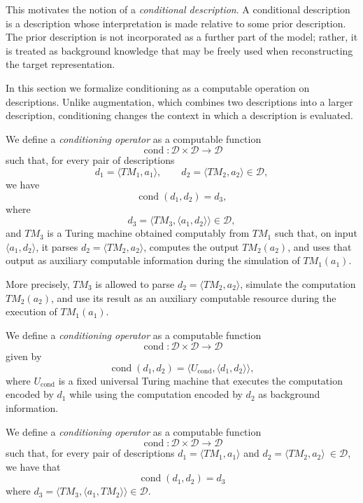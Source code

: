 This motivates the notion of a \emph{conditional description}. A conditional description is a description whose interpretation is made relative to some prior description. The prior description is not incorporated as a further part of the model; rather, it is treated as background knowledge that may be freely used when reconstructing the target representation.

In this section we formalize conditioning as a computable operation on descriptions. Unlike augmentation, which combines two descriptions into a larger description, conditioning changes the context in which a description is
evaluated.

\begin{definition}
We define a \emph{conditioning operator} as a computable function
\[
\operatorname{cond}:\mathcal D\times \mathcal D\to \mathcal D
\]
such that, for every pair of descriptions
\[
d_1 = \langle TM_1, a_1 \rangle,
\qquad
d_2 = \langle TM_2, a_2 \rangle \in \mathcal D,
\]
we have
\[
\operatorname{cond}(d_1,d_2)=d_3,
\]
where
\[
d_3=\langle TM_3,\langle a_1,d_2\rangle\rangle \in \mathcal D,
\]
and \(TM_3\) is a Turing machine obtained computably from \(TM_1\) such that, on input
\(\langle a_1,d_2\rangle\), it parses \(d_2=\langle TM_2,a_2\rangle\), computes the output
\(TM_2(a_2)\), and uses that output as auxiliary computable information during the simulation of
\(TM_1(a_1)\).
\end{definition}

More precisely, \(TM_3\) is allowed to parse \(d_2=\langle TM_2,a_2\rangle\),
simulate the computation \(TM_2(a_2)\), and use its result as an auxiliary
computable resource during the execution of \(TM_1(a_1)\).

\begin{definition}
We define a \emph{conditioning operator} as a computable function
\[
\operatorname{cond}:\mathcal D\times \mathcal D\to \mathcal D
\]
given by
\[
\operatorname{cond}(d_1,d_2)
=
\langle U_{\mathrm{cond}},\langle d_1,d_2\rangle\rangle,
\]
where \(U_{\mathrm{cond}}\) is a fixed universal Turing machine that executes the
computation encoded by \(d_1\) while using the computation encoded by \(d_2\)
as background information.
\end{definition}



\begin{definition}
We define a \emph{conditioning operator} as a computable function
\[
\operatorname{cond}:\mathcal D\times \mathcal D\to \mathcal D
\]
such that, for every pair of descriptions \(d_1 = \langle TM_1, a_1 \rangle\) and
\(d_2 = \langle TM_2, a_2 \rangle\ \in \mathcal D\), we have that
\[
\operatorname{cond}(d_1,d_2) = d_3
\]
where \(d_3=\langle TM_3, \langle a_1, TM_2\rangle \rangle \in \mathcal D\).
\end{definition}



